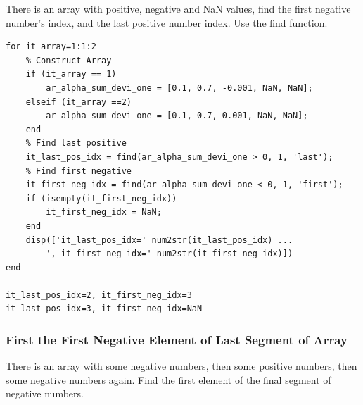 \documentclass[
]{book}
\begin{document}
There is an array with positive, negative and NaN values, find the first
negative number's index, and the last positive number index. Use the
find function.

\begin{verbatim}
for it_array=1:1:2
    % Construct Array
    if (it_array == 1) 
        ar_alpha_sum_devi_one = [0.1, 0.7, -0.001, NaN, NaN];
    elseif (it_array ==2)
        ar_alpha_sum_devi_one = [0.1, 0.7, 0.001, NaN, NaN];
    end
    % Find last positive
    it_last_pos_idx = find(ar_alpha_sum_devi_one > 0, 1, 'last');
    % Find first negative
    it_first_neg_idx = find(ar_alpha_sum_devi_one < 0, 1, 'first');
    if (isempty(it_first_neg_idx))
        it_first_neg_idx = NaN;
    end
    disp(['it_last_pos_idx=' num2str(it_last_pos_idx) ...
        ', it_first_neg_idx=' num2str(it_first_neg_idx)])
end

it_last_pos_idx=2, it_first_neg_idx=3
it_last_pos_idx=3, it_first_neg_idx=NaN
\end{verbatim}

\hypertarget{first-the-first-negative-element-of-last-segment-of-array}{%
\subsubsection{First the First Negative Element of Last Segment of Array}\label{first-the-first-negative-element-of-last-segment-of-array}}

There is an array with some negative numbers, then some positive
numbers, then some negative numbers again. Find the first element of the
final segment of negative numbers.
\end{document}
